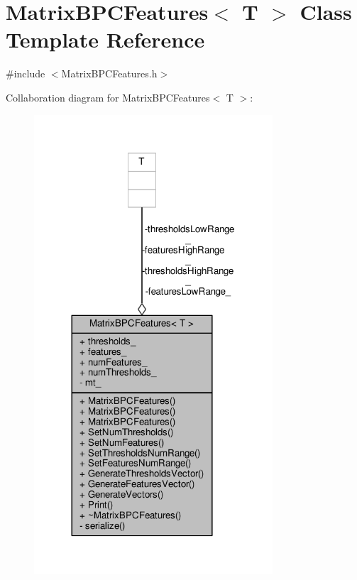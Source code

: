 \hypertarget{classMatrixBPCFeatures}{}\section{Matrix\+B\+P\+C\+Features$<$ T $>$ Class Template Reference}
\label{classMatrixBPCFeatures}


{\ttfamily \#include $<$Matrix\+B\+P\+C\+Features.\+h$>$}



Collaboration diagram for Matrix\+B\+P\+C\+Features$<$ T $>$\+:
\nopagebreak
\begin{figure}[H]
\begin{center}
\leavevmode
\includegraphics[width=252pt]{classMatrixBPCFeatures__coll__graph}
\end{center}
\end{figure}
